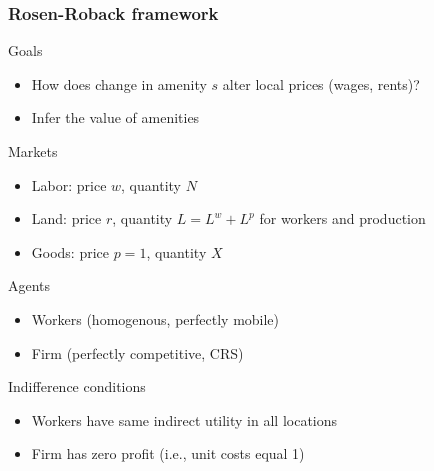 \documentclass[10pt,notes=hide]{beamer}
\begin{document}
\begin{frame}
\frametitle{Rosen-Roback framework}
Goals
\begin{itemize}
\item How does change in amenity $s$ alter local prices (wages, rents)?
\item Infer the value of amenities
\end{itemize}
Markets
\begin{itemize}
\item Labor: price $w$, quantity $N$
\item Land: price $r$, quantity $L=L^w + L^p$ for workers and production
\item Goods: price $p=1$, quantity $X$
\end{itemize}
Agents
\begin{itemize}
\item Workers (homogenous, perfectly mobile)
\item Firm (perfectly competitive, CRS)
\end{itemize}
Indifference conditions
\begin{itemize}
\item Workers have same indirect utility in all locations
\item Firm has zero profit (i.e., unit costs equal 1)
\end{itemize}
\end{frame}
\end{document}
